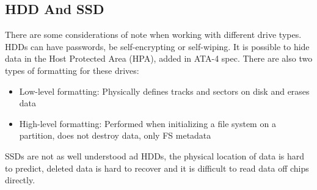 \documentclass[10pt,a4paper]{report}
\begin{document}
\subsection{HDD And SSD}
There are some considerations of note when working with different drive types.
HDDs can have passwords, be self-encrypting or self-wiping. It is possible to hide data in the Host Protected Area (HPA), added in ATA-4 spec. There are also two types of formatting for these drives:
\begin{itemize}
\item Low-level formatting: Physically defines tracks and sectors on disk and erases data
\item High-level formatting: Performed when initializing a file system on a partition, does not destroy data, only FS metadata
\end{itemize}
SSDs are not as well understood ad HDDs, the physical location of data is hard to predict, deleted data is hard to recover and it is difficult to read data off chips directly.
\end{document}
